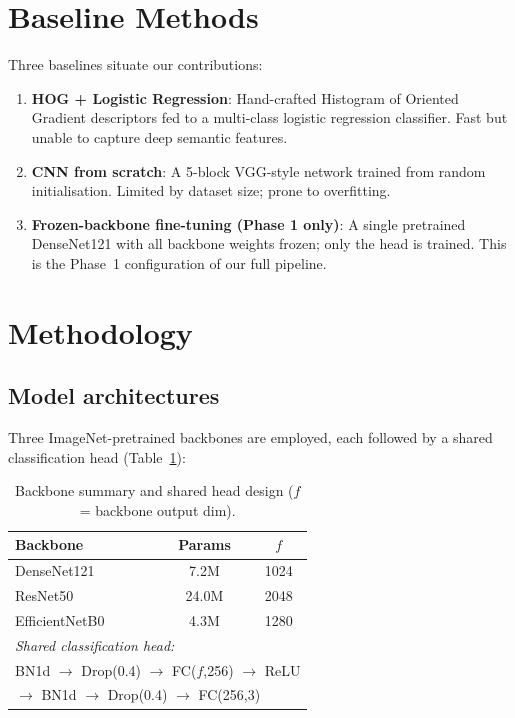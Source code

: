\documentclass{article}
\begin{document}
\section{Baseline Methods}
\label{sec:baseline}

Three baselines situate our contributions:
\begin{enumerate}
  \item \textbf{HOG + Logistic Regression}: Hand-crafted Histogram of Oriented
    Gradient descriptors fed to a multi-class logistic regression classifier.
    Fast but unable to capture deep semantic features.
  \item \textbf{CNN from scratch}: A 5-block VGG-style network trained from random
    initialisation. Limited by dataset size; prone to overfitting.
  \item \textbf{Frozen-backbone fine-tuning (Phase 1 only)}: A single pretrained
    DenseNet121 with all backbone weights frozen; only the head is trained.
    This is the Phase~1 configuration of our full pipeline.
\end{enumerate}

\section{Methodology}
\label{sec:method}

\subsection{Model architectures}

Three ImageNet-pretrained backbones are employed, each followed by a shared
classification head (Table~\ref{tab:arch}):

\begin{table}[h]
\centering
\caption{Backbone summary and shared head design ($f$ = backbone output dim).}
\label{tab:arch}
\small
\begin{tabular}{lcc}
\toprule
\textbf{Backbone} & \textbf{Params} & \textbf{$f$}\\
\midrule
DenseNet121~\cite{huang2017} & 7.2M  & 1024\\
ResNet50~\cite{he2016}       & 24.0M & 2048\\
EfficientNetB0~\cite{tan2019}& 4.3M  & 1280\\
\midrule
\multicolumn{3}{l}{\textit{Shared classification head:}}\\
\multicolumn{3}{l}{BN1d $\to$ Drop(0.4) $\to$ FC($f$,256) $\to$ ReLU}\\
\multicolumn{3}{l}{$\to$ BN1d $\to$ Drop(0.4) $\to$ FC(256,3)}\\
\bottomrule
\end{tabular}
\end{table}
\end{document}
